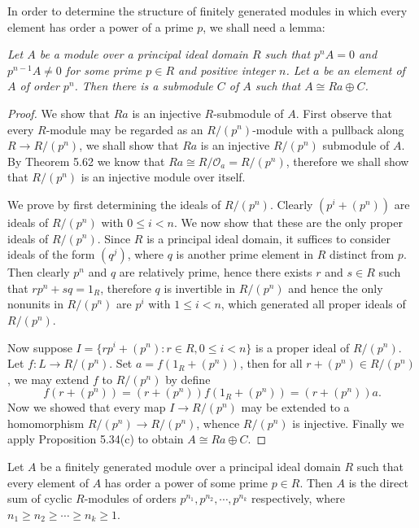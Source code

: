 In order to determine the structure of finitely generated modules in which every element has order a power of a prime $p$, we shall need a lemma:
\begin{lemma}\em
Let $A$ be a module over a principal ideal domain $R$ such that $p^nA=0$ and $p^{n-1}A\ne 0$ for some prime $p\in R$ and positive integer $n$. Let $a$ be an element of $A$ of order $p^n$. Then there is a submodule $C$ of $A$ such that $A\cong Ra\oplus C$.
\end{lemma}
\begin{proof}
We show that $Ra$ is an injective $R$-submodule of $A$. First observe that every $R$-module may be regarded as an $R/(p^n)$-module with a pullback along $R\to R/(p^n)$, we shall show that $Ra$ is an injective $R/(p^n)$ submodule of $A$. By Theorem 5.62 we know that $Ra\cong R/\mathcal{O}_a=R/(p^n)$, therefore we shall show that $R/(p^n)$ is an injective module over itself.\par
We prove by first determining the ideals of $R/(p^n)$. Clearly $(p^i+(p^n))$ are ideals of $R/(p^n)$ with $0\le i<n$. We now show that these are the only proper ideals of $R/(p^n)$. Since $R$ is a principal ideal domain, it suffices to consider ideals of the form $(q^j)$, where $q$ is another prime element in $R$ distinct from $p$. Then clearly $p^n$ and $q$ are relatively prime, hence there exists $r$ and $s\in R$ such that $rp^n+sq=1_R$, therefore $q$ is invertible in $R/(p^n)$ and hence the only nonunits in $R/(p^n)$ are $p^i$ with $1\le i<n$, which generated all proper ideals of $R/(p^n)$.\par
Now suppose $I=\{rp^i+(p^n):r\in R,0\le i<n\}$ is a proper ideal of $R/(p^n)$. Let $f:L\to R/(p^n)$. Set $a=f(1_R+(p^n))$, then for all $r+(p^n)\in R/(p^n)$, we may extend $f$ to $R/(p^n)$ by define 
$$
f\left( r+\left( p^n \right) \right) =\left( r+\left( p^n \right) \right) f\left( 1_R+\left( p^n \right) \right) =\left( r+\left( p^n \right) \right) a.
$$
Now we showed that every map $I\to R/(p^n)$ may be extended to a homomorphism $R/(p^n)\to R/(p^n)$, whence $R/(p^n)$ is injective. Finally we apply Proposition 5.34(c) to obtain $A\cong Ra\oplus C$.
\end{proof}
\begin{theorem}
Let $A$ be a finitely generated module over a principal ideal domain $R$ such that every element of $A$ has order a power of some prime $p\in R$. Then $A$ is the direct sum of cyclic $R$-modules of orders $p^{n_1},p^{n_2},\cdots,p^{n_k}$ respectively, where $n_1\ge n_2\ge\cdots\ge n_k\ge 1$.
\end{theorem}
